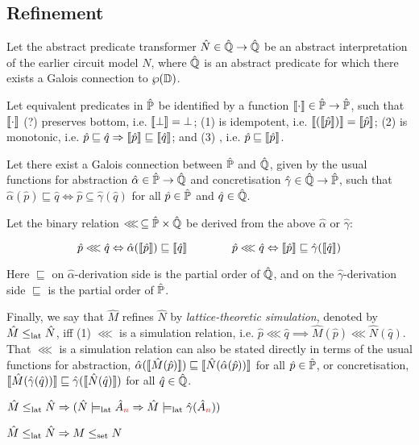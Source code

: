 \subsection{Refinement}

Let the abstract predicate transformer $\hat N \in \hat{\mathbb{Q}} \rightarrow \hat{\mathbb{Q}}$ be an abstract interpretation of the earlier circuit model $N$, where $\hat{\mathbb{Q}}$ is an abstract predicate for which there exists a Galois connection to $\wp(\mathbb{D})$.

Let equivalent predicates in $\hat{\mathbb{P}}$ be identified by a function $\llbracket \cdot \rrbracket \in \hat{\mathbb{P}} \rightarrow \hat{\mathbb{P}}$, such that $\llbracket \cdot \rrbracket$ (?) preserves bottom, i.e. $\llbracket \bot \rrbracket = \bot$; (1) is idempotent, i.e. $\llbracket (\llbracket \hat p \rrbracket) \rrbracket = \llbracket \hat p \rrbracket$; (2) is monotonic, i.e. $\hat p \sqsubseteq \hat q \Rightarrow \llbracket \hat p \rrbracket \sqsubseteq \llbracket \hat q \rrbracket$; and (3) , i.e. $\hat p \sqsubseteq \llbracket \hat p \rrbracket$.

Let there exist a Galois connection between $\hat{\mathbb{P}}$ and $\hat{\mathbb{Q}}$, given by the usual functions for abstraction $\hat \alpha \in \hat{\mathbb{P}} \rightarrow \hat{\mathbb{Q}}$ and concretisation $\hat \gamma \in \hat{\mathbb{Q}} \rightarrow \hat{\mathbb{P}}$, such that $\hat \alpha(\hat p) \sqsubseteq \hat q \iff \hat p \subseteq \hat \gamma(\hat q)$ for all $\hat p \in \hat{\mathbb{P}}$ and $\hat q \in \hat{\mathbb{Q}}$.

Let the binary relation $\lll \, \subseteq \hat{\mathbb{P}} \times \hat{\mathbb{Q}}$ be derived from the above $\hat \alpha$ or $\hat \gamma$:

\begin{equation*}
\hat p \lll \hat q \Leftrightarrow \hat \alpha(\llbracket \hat p \rrbracket) \sqsubseteq \llbracket \hat q \rrbracket \quad\quad\quad\quad \hat p \lll \hat q \Leftrightarrow \llbracket \hat p \rrbracket \sqsubseteq \hat \gamma(\llbracket \hat q \rrbracket)
\end{equation*}

\noindent Here $\sqsubseteq$ on $\hat \alpha$-derivation side is the partial order of $\hat{\mathbb{Q}}$, and on the $\hat \gamma$-derivation side $\sqsubseteq$ is the partial order of $\hat{\mathbb{P}}$.

Finally, we say that $\hat M$ refines $\hat N$ by \textit{lattice-theoretic simulation}, denoted by $\hat M \leq_{\textrm{lat}} \hat N$, iff (1) $\lll$ is a simulation relation, i.e. $\hat p \lll \hat q \implies \hat M(\hat p) \lll \hat N(\hat q)$. That $\lll$ is a simulation relation can also be stated directly in terms of the usual functions for abstraction, $\hat \alpha(\llbracket \hat M(\hat p) \rrbracket) \sqsubseteq \llbracket \hat N(\hat \alpha(\hat p)) \rrbracket$ for all $\hat p \in \hat{\mathbb{P}}$, or concretisation, $\llbracket \hat M(\hat \gamma(\hat q)) \rrbracket \sqsubseteq \hat \gamma(\llbracket \hat N(\hat q) \rrbracket)$ for all $\hat q \in \hat{\mathbb{Q}}$.

\begin{theorem} \label{thm:lat-refines}
$\hat M \leq_{\textrm{lat}} \hat N \Rightarrow (\hat N \models_{\textrm{lat}} \hat{A}_{\textcolor{red}{n}} \Rightarrow \hat M \models_{\textrm{lat}} \hat \gamma(\hat{A}_{\textcolor{red}{n}}))$
\end{theorem}

\begin{theorem} \label{thm:lat-imply-set}
$\hat M \leq_{\textrm{lat}} \hat N \Rightarrow M \leq_{\textrm{set}} N$
\end{theorem}
